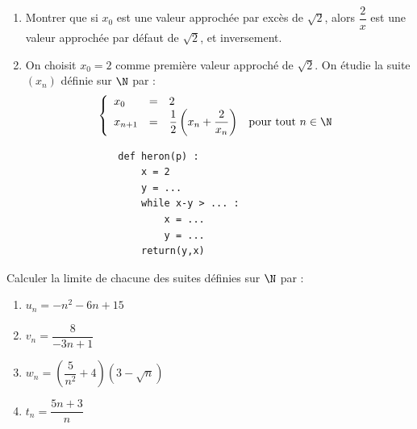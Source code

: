 \documentclass[a4paper,11pt,exos]{nsi} %
\begin{document}
\begin{enumerate}
    \item Montrer que si $x_0$ est une valeur approchée par excès de $\sqrt{2}$, alors $\dfrac{2}{x}$ est une valeur approchée par défaut de $\sqrt{2}$, et inversement.
    \item On choisit $x_0=2$ comme première valeur approché de $\sqrt{2}$. On étudie la suite $(x_n)$ définie sur $\N$ par : 
    $$\left\{
		\begin{array}{llll}
			x_0 & = & 2 & \\
			x_{n+1} & = & \dfrac{1}{2}\left(x_n+\dfrac{2}{x_n}\right) & \text{pour tout } n\in\N\\
		\end{array}
    \right. $$
    \begin{minipage}{11cm}
    \end{minipage} \hspace*{.3cm}
    \begin{minipage}{5.5cm}
        \begin{pyc}
            \begin{verbatim}
                def heron(p) :
                    x = 2
                    y = ...
                    while x-y > ... :
                        x = ...
                        y = ...
                    return(y,x)
            \end{verbatim}
        \end{pyc}
    \end{minipage}
\end{enumerate}

\exo{}
Calculer la limite de chacune des suites définies sur $\N$ par :
\begin{multicols}{2}
    \begin{enumerate}
        \item $u_n=-n^2-6n+15$
        \item $v_n=\dfrac{8}{-3n+1}$
        \item $w_n=\left(\dfrac{5}{n^2}+4\right)\left(3-\sqrt{n}\right)$
        \item $t_n=\dfrac{5n+3}{n}$
    \end{enumerate}
\end{multicols}
\end{document}
